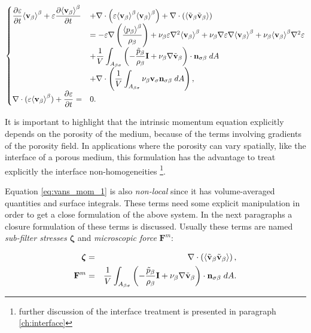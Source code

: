 \begin{eqnarray}
\begin{cases}
 \dfrac{\partial \varepsilon}{\partial t}{\left< \textbf{v}_{\beta} \right>}^{\beta} + \varepsilon \dfrac{\partial {\left< \textbf{v}_{\beta}\right>}^{\beta}}{\partial t} &+ \nabla \cdot \left(\varepsilon {\left< \textbf{v}_{\beta}\right>}^{\beta}{\left< \textbf{v}_{\beta} \right>}^{\beta}\right)   + \nabla \cdot \left({\left< \tilde{\textbf{v}}_{\beta} \tilde{\textbf{v}}_{\beta} \right>}\right)   \\
&= -\varepsilon \nabla \left(\dfrac{{\left< p_{\beta} \right>}^{\beta}}{\rho_{\beta}}\right) + \nu_{\beta} \varepsilon \nabla^2 {\left< \textbf{v}_{\beta} \right>}^{\beta} +  \nu_{\beta} \nabla \varepsilon \nabla {\left< \textbf{v}_{\beta}\right>}^{\beta} + \nu_{\beta} {\left< \textbf{v}_{\beta} \right>}^{\beta} \nabla^2 \varepsilon  \\
&+ \dfrac{1}{V} \displaystyle\int_{A_{\beta \sigma}} \left(-\dfrac{\tilde{p}_{\beta}}{\rho_{\beta}} \mathbf{I}  + \nu_{\beta} \nabla \tilde{\textbf{v}}_{\beta} \right)\cdot \mathbf{n}_{\sigma \beta} \;dA \\
& + \nabla \cdot \left( \dfrac{1}{V} \displaystyle\int_{A_{\beta \sigma}}  \nu_{\beta} \textbf{v}_{\sigma} \mathbf{n}_{\sigma \beta} \;dA \right), \\
\nabla \cdot (\varepsilon{\left< \textbf{v}_{\beta}\right>}^{\beta} ) + \dfrac{\partial \varepsilon}{\partial t} = &0.
\end{cases}
\label{eq:vans_mom_1}
\end{eqnarray}


It is important to highlight that the intrinsic momentum equation explicitly depends on the porosity of the medium, because of the terms involving gradients of the porosity field.
In applications where the porosity can vary spatially, like the interface of a porous medium, this formulation has the advantage to treat explicitly the interface non-homogeneities \footnote{further discussion of the interface treatment is presented in paragraph \ref{ch:interface}}.


Equation \eqref{eq:vans_mom_1} is also \textit{non-local} since it has volume-averaged quantities and surface integrals.
These terms need some explicit manipulation in order to get a close formulation of the above system.
In the next paragraphs a closure formulation of these terms is discussed. Usually these terms are named \textit{sub-filter stresses} $\boldsymbol{\zeta}$ and \textit{microscopic force} $\mathbf{F}^m$:

\begin{eqnarray}
\boldsymbol{\zeta}&=& \nabla \cdot \left({\left< \tilde{\textbf{v}}_{\beta} \tilde{\textbf{v}}_{\beta} \right>}\right), \nonumber \\
\mathbf{F}^m &=&  \dfrac{1}{V} \int_{A_{\beta \sigma}} \left(-\dfrac{\tilde{p}_{\beta}}{\rho_{\beta}} \mathbf{I}  + \nu_{\beta} \nabla \tilde{\textbf{v}}_{\beta} \right)\cdot \mathbf{n}_{\sigma \beta} \;dA. \nonumber
\end{eqnarray}

